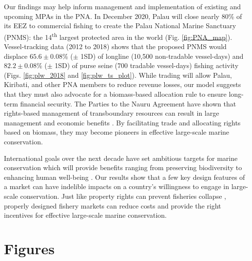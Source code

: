 \documentclass[12pt]{article}
\begin{document}
Our findings may help inform management and implementation of existing and upcoming MPAs in the PNA. In December 2020, Palau will close nearly 80\% of its EEZ to commercial fishing to create the Palau National Marine Sanctuary (PNMS): the 14\textsuperscript{th} largest protected area in the world (Fig. \ref{fig:PNA_map}). Vessel-tracking data (2012 to 2018) shows that the proposed PNMS would displace $65.6 \pm 0.08$\% ($\pm$ 1SD) of longline (10,500 non-tradable vessel-days) and $82.2 \pm 0.08$\% ($\pm$ 1SD) of purse seine (700 tradable vessel-days) fishing activity (Figs. \ref{fig:plw_2018} and \ref{fig:plw_ts_plot}). While trading will allow Palau, Kiribati, and other PNA members to reduce revenue losses, our model suggests that they must also advocate for a biomass-based allocation rule to ensure long-term financial security. The Parties to the Nauru Agreement have shown that rights-based management of transboundary resources can result in large management and economic benefits \cite{havice_2013,aqorau_2018}. By facilitating trade and allocating rights based on biomass, they may become pioneers in effective large-scale marine conservation.

International goals over the next decade have set ambitious targets for marine conservation which will provide benefits ranging from preserving biodiversity to enhancing human well-being \cite{oleary_2016,roberts_2017,dinerstein_2019,ban_2019}. Our results show that a few key design features of a market can have indelible impacts on a country’s willingness to engage in large-scale conservation. Just like property rights can prevent fisheries collapse \cite{costello_2008}, properly designed fishery markets can reduce costs and provide the right incentives for effective large-scale marine conservation.





\clearpage

\FloatBarrier

\section*{Figures}
\end{document}
